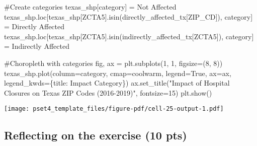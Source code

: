 \documentclass[
  letterpaper,
  DIV=11,
  numbers=noendperiod]{scrartcl}
\newenvironment{Shaded}{\begin{snugshade}}{\end{snugshade}}
\newcommand{\CommentTok}[1]{\textcolor[rgb]{0.37,0.37,0.37}{#1}}
\newcommand{\DecValTok}[1]{\textcolor[rgb]{0.68,0.00,0.00}{#1}}
\newcommand{\NormalTok}[1]{\textcolor[rgb]{0.00,0.23,0.31}{#1}}
\newcommand{\OperatorTok}[1]{\textcolor[rgb]{0.37,0.37,0.37}{#1}}
\newcommand{\StringTok}[1]{\textcolor[rgb]{0.13,0.47,0.30}{#1}}
\newcommand{\VariableTok}[1]{\textcolor[rgb]{0.07,0.07,0.07}{#1}}
\begin{document}
\begin{Shaded}
\begin{Highlighting}[]
\CommentTok{\#Create categories}
\NormalTok{texas\_shp[}\StringTok{\textquotesingle{}category\textquotesingle{}}\NormalTok{] }\OperatorTok{=} \StringTok{\textquotesingle{}Not Affected\textquotesingle{}}
\NormalTok{texas\_shp.loc[texas\_shp[}\StringTok{\textquotesingle{}ZCTA5\textquotesingle{}}\NormalTok{].isin(directly\_affected\_tx[}\StringTok{\textquotesingle{}ZIP\_CD\textquotesingle{}}\NormalTok{]), }\StringTok{\textquotesingle{}category\textquotesingle{}}\NormalTok{] }\OperatorTok{=} \StringTok{\textquotesingle{}Directly Affected\textquotesingle{}}
\NormalTok{texas\_shp.loc[texas\_shp[}\StringTok{\textquotesingle{}ZCTA5\textquotesingle{}}\NormalTok{].isin(indirectly\_affected\_tx[}\StringTok{\textquotesingle{}ZCTA5\textquotesingle{}}\NormalTok{]), }\StringTok{\textquotesingle{}category\textquotesingle{}}\NormalTok{] }\OperatorTok{=} \StringTok{\textquotesingle{}Indirectly Affected\textquotesingle{}}

\CommentTok{\#Choropleth with categories}
\NormalTok{fig, ax }\OperatorTok{=}\NormalTok{ plt.subplots(}\DecValTok{1}\NormalTok{, }\DecValTok{1}\NormalTok{, figsize}\OperatorTok{=}\NormalTok{(}\DecValTok{8}\NormalTok{, }\DecValTok{8}\NormalTok{))}
\NormalTok{texas\_shp.plot(column}\OperatorTok{=}\StringTok{\textquotesingle{}category\textquotesingle{}}\NormalTok{, cmap}\OperatorTok{=}\StringTok{\textquotesingle{}coolwarm\textquotesingle{}}\NormalTok{, legend}\OperatorTok{=}\VariableTok{True}\NormalTok{, ax}\OperatorTok{=}\NormalTok{ax, }
\NormalTok{               legend\_kwds}\OperatorTok{=}\NormalTok{\{}\StringTok{\textquotesingle{}title\textquotesingle{}}\NormalTok{: }\StringTok{\textquotesingle{}Impact Category\textquotesingle{}}\NormalTok{\})}
\NormalTok{ax.set\_title(}\StringTok{"Impact of Hospital Closures on Texas ZIP Codes (2016{-}2019)"}\NormalTok{, fontsize}\OperatorTok{=}\DecValTok{15}\NormalTok{)}
\NormalTok{plt.show()}
\end{Highlighting}
\end{Shaded}

\texttt{[image: pset4\_template\_files/figure-pdf/cell-25-output-1.pdf]}

\subsection{Reflecting on the exercise (10
pts)}\label{reflecting-on-the-exercise-10-pts}
\end{document}
